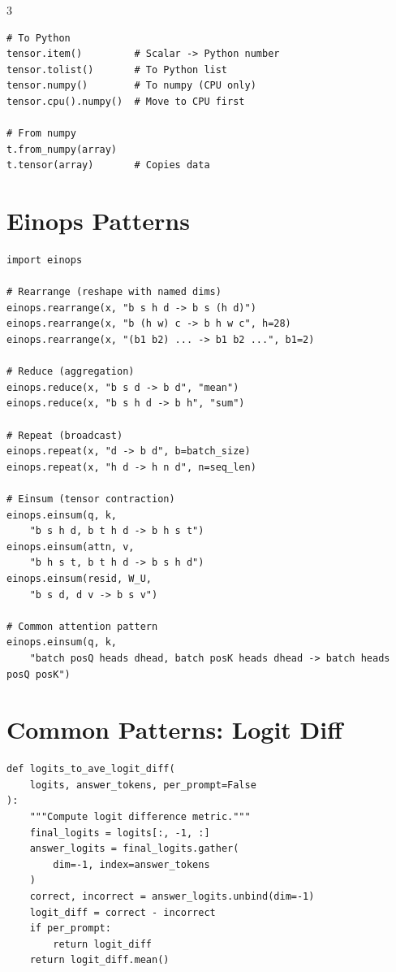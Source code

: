 \documentclass[10pt,a4paper,landscape]{article}
\begin{document}
\begin{multicols}{3}
\begin{lstlisting}
# To Python
tensor.item()         # Scalar -> Python number
tensor.tolist()       # To Python list
tensor.numpy()        # To numpy (CPU only)
tensor.cpu().numpy()  # Move to CPU first

# From numpy
t.from_numpy(array)
t.tensor(array)       # Copies data
\end{lstlisting}

\section{Einops Patterns}

\begin{lstlisting}
import einops

# Rearrange (reshape with named dims)
einops.rearrange(x, "b s h d -> b s (h d)")
einops.rearrange(x, "b (h w) c -> b h w c", h=28)
einops.rearrange(x, "(b1 b2) ... -> b1 b2 ...", b1=2)

# Reduce (aggregation)
einops.reduce(x, "b s d -> b d", "mean")
einops.reduce(x, "b s h d -> b h", "sum")

# Repeat (broadcast)
einops.repeat(x, "d -> b d", b=batch_size)
einops.repeat(x, "h d -> h n d", n=seq_len)

# Einsum (tensor contraction)
einops.einsum(q, k,
    "b s h d, b t h d -> b h s t")
einops.einsum(attn, v,
    "b h s t, b t h d -> b s h d")
einops.einsum(resid, W_U,
    "b s d, d v -> b s v")

# Common attention pattern
einops.einsum(q, k,
    "batch posQ heads dhead, batch posK heads dhead -> batch heads posQ posK")
\end{lstlisting}

\section{Common Patterns: Logit Diff}

\begin{lstlisting}
def logits_to_ave_logit_diff(
    logits, answer_tokens, per_prompt=False
):
    """Compute logit difference metric."""
    final_logits = logits[:, -1, :]
    answer_logits = final_logits.gather(
        dim=-1, index=answer_tokens
    )
    correct, incorrect = answer_logits.unbind(dim=-1)
    logit_diff = correct - incorrect
    if per_prompt:
        return logit_diff
    return logit_diff.mean()
\end{lstlisting}


\end{multicols}
\end{document}
